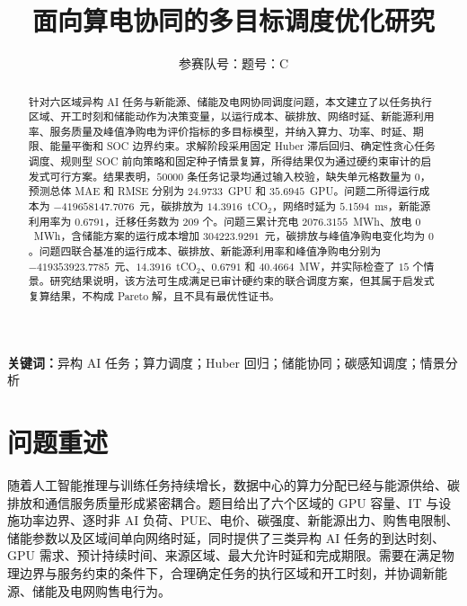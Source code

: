 \documentclass[withoutpreface,bwprint]{cumcmthesis}
\title{面向算电协同的多目标调度优化研究}
\author{参赛队号：\quad 题号：C}
\date{}
\begin{document}
\maketitle

\begin{abstract}
针对六区域异构 AI 任务与新能源、储能及电网协同调度问题，本文建立了以任务执行区域、开工时刻和储能动作为决策变量，以运行成本、碳排放、网络时延、新能源利用率、服务质量及峰值净购电为评价指标的多目标模型，并纳入算力、功率、时延、期限、能量平衡和 SOC 边界约束。求解阶段采用固定 Huber 滞后回归、确定性贪心任务调度、规则型 SOC 前向策略和固定种子情景复算，所得结果仅为通过硬约束审计的启发式可行方案。结果表明，$50000$ 条任务记录均通过输入校验，缺失单元格数量为 $0$，预测总体 MAE 和 RMSE 分别为 $24.9733$~GPU 和 $35.6945$~GPU。问题二所得运行成本为 $-419658147.7076$~元，碳排放为 $14.3916$~tCO$_2$，网络时延为 $5.1594$~ms，新能源利用率为 $0.6791$，迁移任务数为 $209$ 个。问题三累计充电 $2076.3155$~MWh、放电 $0$~MWh，含储能方案的运行成本增加 $304223.9291$~元，碳排放与峰值净购电变化均为 $0$。问题四联合基准的运行成本、碳排放、新能源利用率和峰值净购电分别为 $-419353923.7785$~元、$14.3916$~tCO$_2$、$0.6791$ 和 $40.4664$~MW，并实际检查了 $15$ 个情景。研究结果说明，该方法可生成满足已审计硬约束的联合调度方案，但其属于启发式复算结果，不构成 Pareto 解，且不具有最优性证书。
\end{abstract}

\noindent\textbf{关键词：}异构 AI 任务；算力调度；Huber 回归；储能协同；碳感知调度；情景分析

\clearpage

\small
\linespread{0.94}\selectfont
\setlength{\parskip}{0pt}
\setlength{\emergencystretch}{3em}
\setlength{\abovedisplayskip}{4pt plus 1pt minus 1pt}
\setlength{\belowdisplayskip}{4pt plus 1pt minus 1pt}
\setlength{\abovedisplayshortskip}{3pt plus 1pt minus 1pt}
\setlength{\belowdisplayshortskip}{3pt plus 1pt minus 1pt}
\setlength{\textfloatsep}{8pt plus 2pt minus 2pt}
\setlength{\floatsep}{7pt plus 2pt minus 2pt}
\setlength{\intextsep}{7pt plus 2pt minus 2pt}
\setlength{\abovecaptionskip}{3pt}
\setlength{\belowcaptionskip}{2pt}

\section{问题重述}

随着人工智能推理与训练任务持续增长，数据中心的算力分配已经与能源供给、碳排放和通信服务质量形成紧密耦合。题目给出了六个区域的 GPU 容量、IT 与设施功率边界、逐时非 AI 负荷、PUE、电价、碳强度、新能源出力、购售电限制、储能参数以及区域间单向网络时延，同时提供了三类异构 AI 任务的到达时刻、GPU 需求、预计持续时间、来源区域、最大允许时延和完成期限。需要在满足物理边界与服务约束的条件下，合理确定任务的执行区域和开工时刻，并协调新能源、储能及电网购售电行为。
\end{document}
